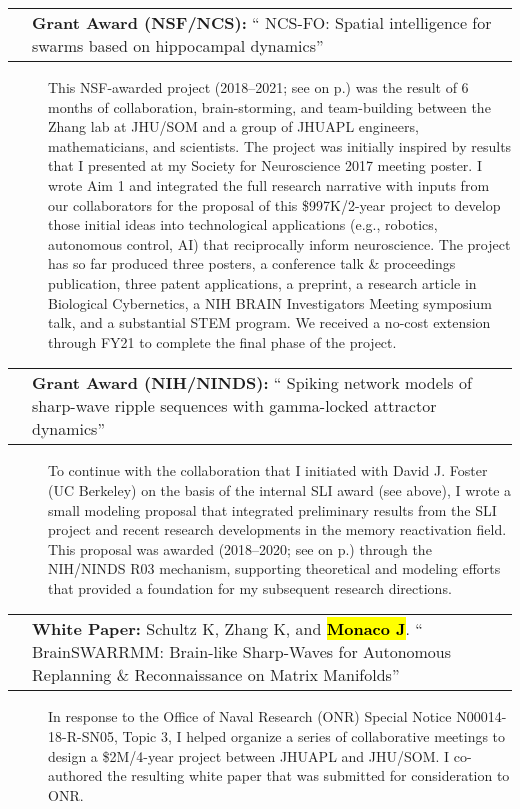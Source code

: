 \documentclass[10pt]{article}
\makeatletter
\newcommand{\unpubtitle}[1]{{\color{hopkinsblue} #1}}
\newcommand{\joehl}[1]{\hl{\textbf{#1}}}
\newcommand{\researchnote}[1]{
  \begin{description}
    \item[] {\hspace{2.2ex}\color{darkgray} #1}
  \end{description}
}
\newcommand{\researchactivity}[4]{
  \begin{minipage}[t]{\textwidth}
    \begin{tabular}{@{\hspace{2ex}}l>{\raggedright\arraybackslash}p{.8\textwidth}}
      \makebox[1.2in][l]{#1} & \textbf{#2:}
      ``\unpubtitle{#3}'' 
    \end{tabular}
  \researchnote{\hspace{1ex} #4}
  \end{minipage}
  \medbreak
}
\newcommand{\whitepaper}[4]{
  \begin{minipage}[t]{\textwidth}
    \begin{tabular}{@{\hspace{2ex}}l>{\raggedright\arraybackslash}p{.8\textwidth}}
      \makebox[1.2in][l]{#1} & \textbf{White Paper:} #2.
      ``\unpubtitle{#3}'' 
    \end{tabular}
  \researchnote{\hspace{1ex} #4}
  \end{minipage}
  \medbreak
}
\makeatother
\begin{document}
\researchactivity
{Nov. 2017--2021\label{sec:nsf}}
{Grant Award (NSF/NCS)}
{NCS-FO: Spatial intelligence for swarms based on hippocampal dynamics}
{This NSF-awarded project (2018--2021; see \emph{\nameref{sec:funding}}
  on p.\pageref{sec:funding}) was the result of 6 months of collaboration,
  brain-storming, and team-building between the Zhang lab at JHU/SOM and a group
  of JHUAPL engineers, mathematicians, and scientists. The project was initially
  inspired by results that I presented at my Society for Neuroscience 2017 meeting
  poster. I wrote Aim 1 and integrated the full research narrative with inputs
  from our collaborators for the proposal of this \$997K/2-year project to develop
  those initial ideas into technological applications (e.g., robotics, autonomous
  control, AI) that reciprocally inform neuroscience. The project has so far
  produced three posters, a conference talk \& proceedings publication, three
  patent applications, a preprint, a research article in Biological Cybernetics, a
  NIH BRAIN Investigators Meeting symposium talk, and a substantial STEM program.
  We received a no-cost extension through FY21 to complete the final phase of the
project.}

\researchactivity
{Jan. 2018--2020}
{Grant Award (NIH/NINDS)}
{Spiking network models of sharp-wave ripple sequences with gamma-locked
attractor dynamics}
{To continue with the collaboration that I initiated with David J. Foster
  (UC Berkeley) on the basis of the internal SLI award (see above), I wrote
  a small modeling proposal that integrated preliminary results from the SLI
  project and recent research developments in the memory reactivation field.
  This proposal was awarded (2018--2020; see \emph{\nameref{sec:funding}} on
  p.\pageref{sec:funding}) through the NIH/NINDS R03 mechanism, supporting
  theoretical and modeling efforts that provided a foundation for my subsequent
research directions.}
\label{sec:nih}

\whitepaper
{Feb.--Mar. 2018}
{Schultz K, Zhang K, and \joehl{Monaco J}}
{BrainSWARRMM: Brain-like Sharp-Waves for Autonomous Replanning \&
Reconnaissance on Matrix Manifolds}
{In response to the Office of Naval Research (ONR) Special Notice
  N00014-18-R-SN05, Topic 3, I helped organize a series of collaborative meetings
  to design a \$2M/4-year project between JHUAPL and JHU/SOM. I co-authored the
resulting white paper that was submitted for consideration to ONR.}
\end{document}
